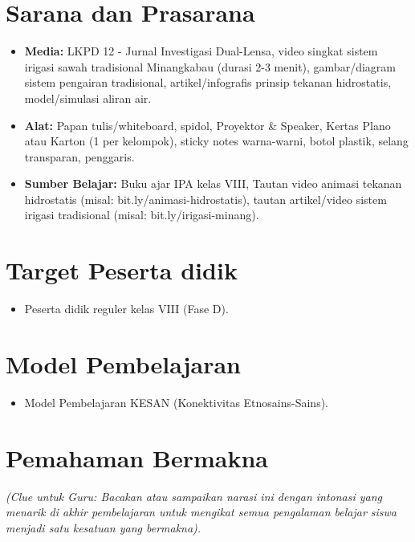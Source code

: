 \documentclass[12pt,a4paper]{article}
\begin{document}
\section{Sarana dan Prasarana}

\begin{itemize}
\item \textbf{Media:} LKPD 12 - Jurnal Investigasi Dual-Lensa, video singkat sistem irigasi sawah tradisional Minangkabau (durasi 2-3 menit), gambar/diagram sistem pengairan tradisional, artikel/infografis prinsip tekanan hidrostatis, model/simulasi aliran air.
\item \textbf{Alat:} Papan tulis/whiteboard, spidol, Proyektor \& Speaker, Kertas Plano atau Karton (1 per kelompok), sticky notes warna-warni, botol plastik, selang transparan, penggaris.
\item \textbf{Sumber Belajar:} Buku ajar IPA kelas VIII, Tautan video animasi tekanan hidrostatis (misal: bit.ly/animasi-hidrostatis), tautan artikel/video sistem irigasi tradisional (misal: bit.ly/irigasi-minang).
\end{itemize}

\section{Target Peserta didik}

\begin{itemize}
\item Peserta didik reguler kelas VIII (Fase D).
\end{itemize}

\section{Model Pembelajaran}

\begin{itemize}
\item Model Pembelajaran KESAN (Konektivitas Etnosains-Sains).
\end{itemize}

\section{Pemahaman Bermakna}
\textit{(Clue untuk Guru: Bacakan atau sampaikan narasi ini dengan intonasi yang menarik di akhir pembelajaran untuk mengikat semua pengalaman belajar siswa menjadi satu kesatuan yang bermakna).}
\end{document}
